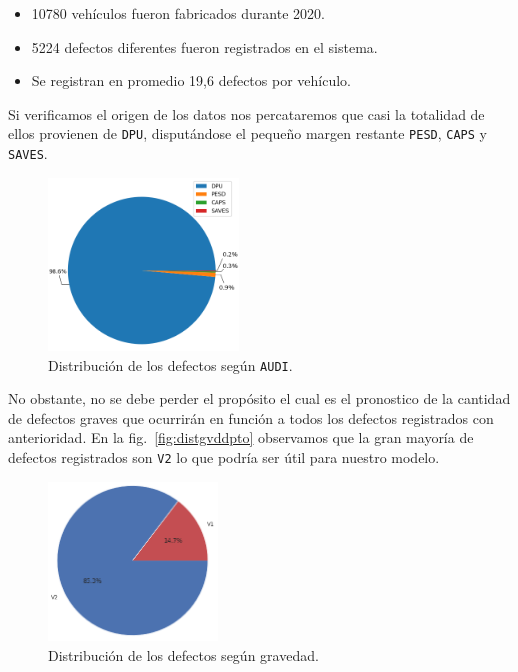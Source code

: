 \documentclass[a4paper,12pt]{article}
\begin{document}
		\begin{itemize}[noitemsep, topsep=2pt]
			\item 10780 vehículos fueron fabricados durante 2020.
			\item 5224 defectos diferentes fueron registrados en el sistema.
			\item Se registran en promedio 19,6 defectos por vehículo.
		\end{itemize}
						
		Si verificamos el origen de los datos nos percataremos que casi la totalidad de ellos provienen de \texttt{DPU}, disputándose el pequeño margen restante \texttt{PESD}, \texttt{CAPS} y \texttt{SAVES}.
						
		\begin{figure}[H]
			\begin{center}				
				\includegraphics[width=0.45\textwidth]{audidist.png}
				\caption{Distribución de los defectos según \texttt{AUDI}.}
				\label{fig:distaudi}
			\end{center}
		\end{figure}
						
		No obstante, no se debe perder el propósito el cual es el pronostico de la cantidad de defectos graves que ocurrirán en función a todos los defectos registrados con anterioridad. En la fig.~\ref{fig:distgvddpto} observamos que la gran mayoría de defectos registrados son \texttt{V2} lo que podría ser útil para nuestro modelo.
						
		\begin{figure}[H]
			\begin{center}				
				\includegraphics[width=0.40\textwidth]{tesis_51.png}
				\caption{Distribución de los defectos según gravedad.}
				\label{fig:distgvd}
			\end{center}
		\end{figure}
						
\end{document}
